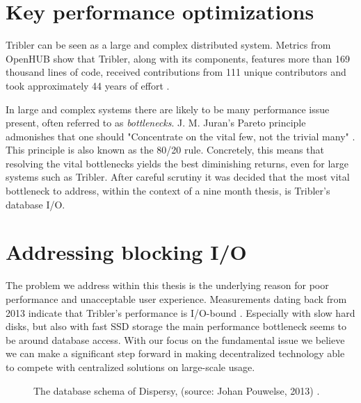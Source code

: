 \section{Key performance optimizations}

Tribler can be seen as a large and complex distributed system.
Metrics from OpenHUB show that Tribler, along with its components, features more than 169 thousand lines of code, received contributions from 111 unique contributors and took approximately 44 years of effort \cite{openhub2016tribler}.

In large and complex systems there are likely to be many performance issue present, often referred to as \emph{bottlenecks}.
J. M. Juran's Pareto principle admonishes that one should "Concentrate on the vital few, not the trivial many" \cite{ammons2004finding}. This principle is also known as the 80/20 rule.
Concretely, this means that resolving the vital bottlenecks yields the best diminishing returns, even for large systems such as Tribler.
After careful scrutiny it was decided that the most vital bottleneck to address, within the context of a nine month thesis, is Tribler's database I/O.

\section{Addressing blocking I/O}
\label{sct:triblers_database_dependency}

The problem we address within this thesis is the underlying reason for poor performance and unacceptable user experience. 
Measurements dating back from 2013 indicate that Tribler's performance is I/O-bound \cite{pouwelse2014reduce}.
Especially with slow hard disks, but also with fast SSD storage the main performance bottleneck seems to be around database access.
With our focus on the fundamental issue we believe we can make a significant step forward in making decentralized technology able to compete with centralized solutions on large-scale usage.

\begin{figure}[!h]
	\caption{The database schema of Dispersy, (source: Johan Pouwelse, 2013) \cite{pouwelse2013documentation}.}
	\label{fig:dispersy_database_schema}
\end{figure}

